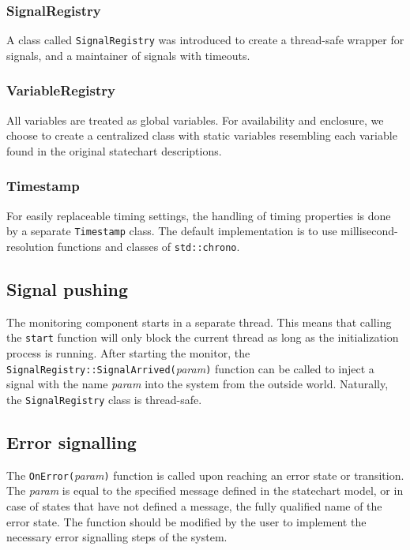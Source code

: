     \subsubsection{SignalRegistry}
A class called \verb!SignalRegistry! was introduced to create a thread-safe wrapper for signals, and a maintainer of signals with timeouts.
    \subsubsection{VariableRegistry}
All variables are treated as global variables. For availability and enclosure, we choose to create a centralized class with static variables resembling each variable found in the original statechart descriptions.
    \subsubsection{Timestamp}
For easily replaceable timing settings, the handling of timing properties is done by a separate \verb!Timestamp! class. The default implementation is to use millisecond-resolution functions and classes of \verb!std::chrono!.
  \subsection{Signal pushing}
The monitoring component starts in a separate thread. This means that calling the \verb!start! function will only block the current thread as long as the initialization process is running. After starting the monitor, the \verb!SignalRegistry::SignalArrived(!\textit{param}\verb!)! function can be called to inject a signal with the name \textit{param} into the system from the outside world. Naturally, the \verb!SignalRegistry! class is thread-safe.
  \subsection{Error signalling}
The \verb!OnError(!\textit{param}\verb!)! function is called upon reaching an error state or transition. The \textit{param} is equal to the specified message defined in the statechart model, or in case of states that have not defined a message, the fully qualified name of the error state. The function should be modified by the user to implement the necessary error signalling steps of the system.
